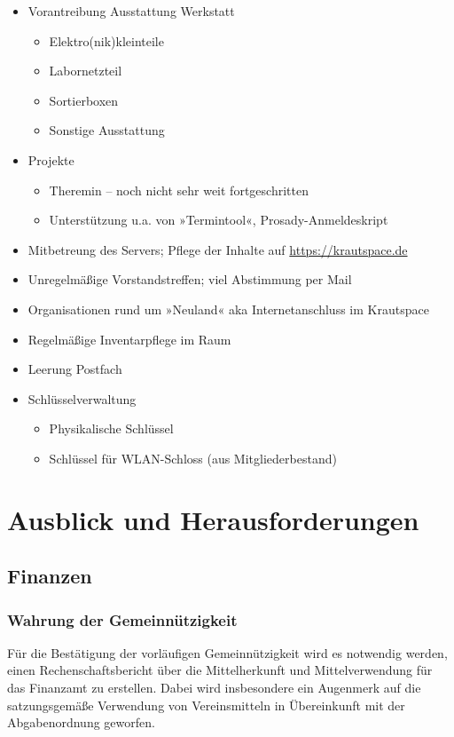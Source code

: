 \documentclass[10pt,DIV16]{scrartcl}
\begin{document}
\begin{itemize}
\begin{itemize}
		\end{itemize}
	\item Vorantreibung Ausstattung Werkstatt
		\begin{itemize}
			\item Elektro(nik)kleinteile
			\item Labornetzteil
			\item Sortierboxen
			\item Sonstige Ausstattung
		\end{itemize}
	\item Projekte
		\begin{itemize}
			\item Theremin -- noch nicht sehr weit fortgeschritten
			\item Unterstützung u.a. von »Termintool«, Prosady-Anmeldeskript
		\end{itemize}
	\item Mitbetreung des Servers; Pflege der Inhalte auf \url{https://krautspace.de}
	\item Unregelmäßige Vorstandstreffen; viel Abstimmung per Mail
	\item Organisationen rund um »Neuland« aka Internetanschluss im Krautspace
	\item Regelmäßige Inventarpflege im Raum
	\item Leerung Postfach
	\item Schlüsselverwaltung
		\begin{itemize}
			\item Physikalische Schlüssel
			\item Schlüssel für WLAN-Schloss (aus Mitgliederbestand)
		\end{itemize}
\end{itemize}

\section{Ausblick und Herausforderungen}

\subsection{Finanzen}
\label{sec:ausblick:finanzen}

\subsubsection{Wahrung der Gemeinnützigkeit}

Für die Bestätigung der vorläufigen Gemeinnützigkeit wird es notwendig
werden, einen Rechenschaftsbericht über die Mittelherkunft und
Mittelverwendung für das Finanzamt zu erstellen. Dabei wird
insbesondere ein Augenmerk auf die satzungsgemäße Verwendung von
Vereinsmitteln in Übereinkunft mit der Abgabenordnung geworfen.
\end{document}
